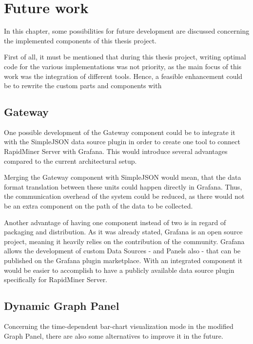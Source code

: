 \chapter{Future work}

In this chapter, some possibilities for future development are discussed concerning the implemented components of this thesis project.

First of all, it must be mentioned that during this thesis project, writing optimal code for the various implementations was not priority, as the main focus of this work was the integration of different tools. Hence, a feasible enhancement could be to rewrite the custom parts and components with

\section{Gateway}

One possible development of the Gateway component could be to integrate it with the SimpleJSON data source plugin in order to create one tool to connect RapidMiner Server with Grafana. This would introduce several advantages compared to the current architectural setup.

Merging the Gateway component with SimpleJSON would mean, that the data format translation between these units could happen directly in Grafana. Thus, the communication overhead of the system could be reduced, as there would not be an extra component on the path of the data to be collected.



Another advantage of having one component instead of two is in regard of packaging and distribution. As it was already stated, Grafana is an open source project, meaning it heavily relies on the contribution of the community. Grafana allows the development of custom Data Sources - and Panels also - that can be published on the Grafana plugin marketplace. With an integrated component it would be easier to accomplish to have a publicly available data source plugin specifically for RapidMiner Server. 

\section{Dynamic Graph Panel}

Concerning the time-dependent bar-chart visualization mode in the modified Graph Panel, there are also some alternatives to improve it in the future.

